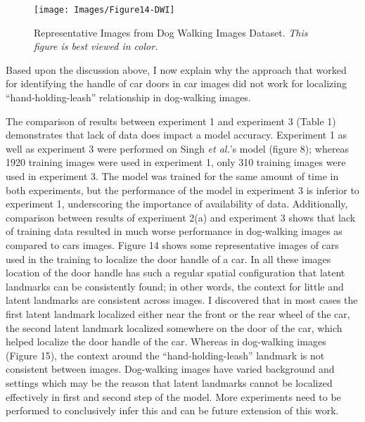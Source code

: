 \documentclass [11pt,letterpaper ,twoside ,openany ]{report}
\begin{document}
    \begin{figure}[t!]
      \centering
      \texttt{[image: Images/Figure14-DWI]}
      \caption{Representative Images from Dog Walking Images Dataset. \textit{This figure is best viewed in color.}}
      \label{fig:dwi}
    \end{figure}            

    Based upon the discussion above, I now explain why the approach that worked for identifying the handle of car doors in car images did not work for localizing ``hand-holding-leash'' relationship in dog-walking images.    

    The comparison of results between experiment 1 and experiment 3 (Table 1) demonstrates that lack of data does impact a model accuracy. Experiment 1 as well as experiment 3 were performed on Singh \textit{et al.}'s model (figure 8); whereas 1920 training images were used in experiment 1, only 310 training images were used in experiment 3. The model was trained for the same amount of time in both experiments, but the performance of the model in experiment 3 is inferior to experiment 1, underscoring the importance of availability of data. Additionally, comparison between results of experiment 2(a) and experiment 3 shows that lack of training data resulted in much worse performance in dog-walking images as compared to cars images. Figure 14 shows some representative images of cars used in the training to localize the door handle of a car. In all these images location of the door handle has such a regular spatial configuration that latent landmarks can be consistently found; in other words, the context for little and latent landmarks are consistent across images. I discovered that in most cases the first latent landmark localized either near the front or the rear wheel of the car, the second latent landmark localized somewhere on the door of the car, which helped localize the door handle of the car. Whereas in dog-walking images (Figure 15), the context around the ``hand-holding-leash'' landmark is not consistent between images. Dog-walking images have varied background and settings which may be the reason that latent landmarks cannot be localized effectively in first and second step of the model. More experiments need to be performed to conclusively infer  this and can be future extension of this work.
\end{document}
